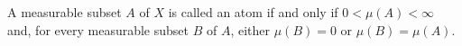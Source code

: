 A measurable subset $A$ of $X$ is called an atom if and only if $0 < \mu(A) < \infty$ and, for every measurable subset $B$ of $A$, either $\mu(B) = 0$ or $\mu(B) = \mu(A)$.

